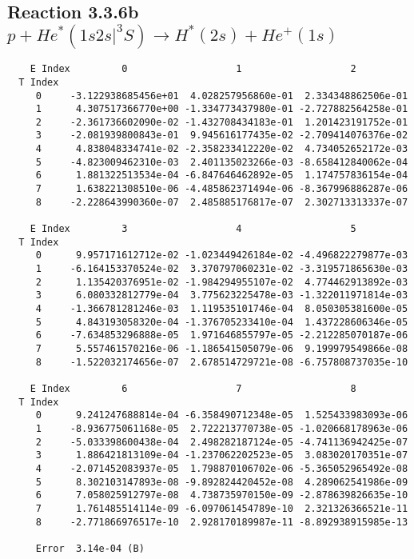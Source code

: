 \documentclass[12pt]{article}
\begin{document}
                               


\newpage
\subsection{
Reaction 3.3.6b $  p + He^*(1s2s|^3S) \rightarrow H^*(2s) + He^+(1s)$}


\begin{small}\begin{verbatim}
    E Index         0                   1                   2
  T Index
     0     -3.122938685456e+01  4.028257956860e-01  2.334348862506e-01
     1      4.307517366770e+00 -1.334773437980e-01 -2.727882564258e-01
     2     -2.361736602090e-02 -1.432708434183e-01  1.201423191752e-01
     3     -2.081939800843e-01  9.945616177435e-02 -2.709414076376e-02
     4      4.838048334741e-02 -2.358233412220e-02  4.734052652172e-03
     5     -4.823009462310e-03  2.401135023266e-03 -8.658412840062e-04
     6      1.881322513534e-04 -6.847646462892e-05  1.174757836154e-04
     7      1.638221308510e-06 -4.485862371494e-06 -8.367996886287e-06
     8     -2.228643990360e-07  2.485885176817e-07  2.302713313337e-07

    E Index         3                   4                   5
  T Index
     0      9.957171612712e-02 -1.023449426184e-02 -4.496822279877e-03
     1     -6.164153370524e-02  3.370797060231e-02 -3.319571865630e-03
     2      1.135420376951e-02 -1.984294955107e-02  4.774462913892e-03
     3      6.080332812779e-04  3.775623225478e-03 -1.322011971814e-03
     4     -1.366781281246e-03  1.119535101746e-04  8.050305381600e-05
     5      4.843193058320e-04 -1.376705233410e-04  1.437228606346e-05
     6     -7.634853296888e-05  1.971646855797e-05 -2.212285070187e-06
     7      5.557461570216e-06 -1.186541505079e-06  9.199979549866e-08
     8     -1.522032174656e-07  2.678514729721e-08 -6.757808737035e-10

    E Index         6                   7                   8
  T Index
     0      9.241247688814e-04 -6.358490712348e-05  1.525433983093e-06
     1     -8.936775061168e-05  2.722213770738e-05 -1.020668178963e-06
     2     -5.033398600438e-04  2.498282187124e-05 -4.741136942425e-07
     3      1.886421813109e-04 -1.237062202523e-05  3.083020170351e-07
     4     -2.071452083937e-05  1.798870106702e-06 -5.365052965492e-08
     5      8.302103147893e-08 -9.892824420452e-08  4.289062541986e-09
     6      7.058025912797e-08  4.738735970150e-09 -2.878639826635e-10
     7      1.761485514114e-09 -6.097061454789e-10  2.321326366521e-11
     8     -2.771866976517e-10  2.928170189987e-11 -8.892938915985e-13

     Error  3.14e-04 (B)
\end{verbatim}\end{small}
\end{document}
